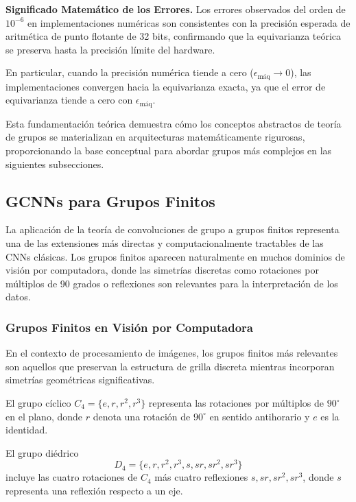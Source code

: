 \textbf{Significado Matemático de los Errores.} Los errores observados del orden de $10^{-6}$ en implementaciones numéricas son consistentes con la precisión esperada de aritmética de punto flotante de 32 bits, confirmando que la equivarianza teórica se preserva hasta la precisión límite del hardware.

En particular, cuando la precisión numérica tiende a cero ($\epsilon_{\text{máq}} \to 0$), las implementaciones convergen hacia la equivarianza exacta, ya que el error de equivarianza tiende a cero con $\epsilon_{\text{máq}}$.

Esta fundamentación teórica demuestra cómo los conceptos abstractos de teoría de grupos se materializan en arquitecturas matemáticamente rigurosas, proporcionando la base conceptual para abordar grupos más complejos en las siguientes subsecciones.

\subsection[GCNNs para Grupos Finitos]{\glspl{GCNN} para Grupos Finitos}\label{subsec:gcnns_grupos_finitos}

La aplicación de la teoría de convoluciones de grupo a grupos finitos representa una de las extensiones más directas y computacionalmente tractables de las \glspl{CNN} clásicas. Los grupos finitos aparecen naturalmente en muchos dominios de visión por computadora, donde las simetrías discretas como rotaciones por múltiplos de 90 grados o reflexiones son relevantes para la interpretación de los datos.

\subsubsection{Grupos Finitos en Visión por Computadora}

En el contexto de procesamiento de imágenes, los grupos finitos más relevantes son aquellos que preservan la estructura de grilla discreta mientras incorporan simetrías geométricas significativas.

\begin{definition}
El grupo cíclico $C_4 = \{e, r, r^2, r^3\}$ representa las rotaciones por múltiplos de $90^\circ$ en el plano, donde $r$ denota una rotación de $90^\circ$ en sentido antihorario y $e$ es la identidad.
\end{definition}

\begin{definition}
El grupo diédrico
\[
D_4 = \{e, r, r^2, r^3, s, sr, sr^2, sr^3\}
\]
incluye las cuatro rotaciones de $C_4$ más cuatro reflexiones $s, sr, sr^2, sr^3$, donde $s$ representa una reflexión respecto a un eje.
\end{definition}

